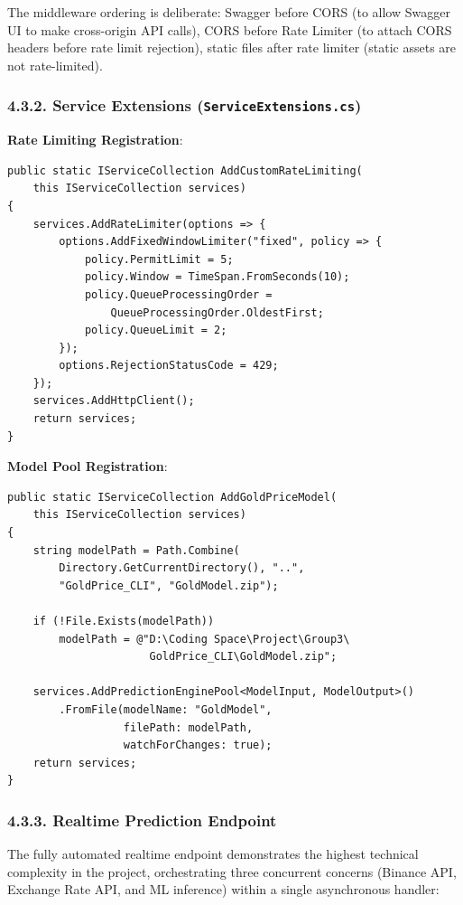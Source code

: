 The middleware ordering is deliberate: Swagger before CORS (to allow Swagger UI to make cross-origin API calls), CORS before Rate Limiter (to attach CORS headers before rate limit rejection), static files after rate limiter (static assets are not rate-limited).

\subsubsection{4.3.2. Service Extensions (\texttt{ServiceExtensions.cs})}

\textbf{Rate Limiting Registration}:
\begin{lstlisting}
public static IServiceCollection AddCustomRateLimiting(
    this IServiceCollection services)
{
    services.AddRateLimiter(options => {
        options.AddFixedWindowLimiter("fixed", policy => {
            policy.PermitLimit = 5;
            policy.Window = TimeSpan.FromSeconds(10);
            policy.QueueProcessingOrder =
                QueueProcessingOrder.OldestFirst;
            policy.QueueLimit = 2;
        });
        options.RejectionStatusCode = 429;
    });
    services.AddHttpClient();
    return services;
}
\end{lstlisting}

\textbf{Model Pool Registration}:
\begin{lstlisting}
public static IServiceCollection AddGoldPriceModel(
    this IServiceCollection services)
{
    string modelPath = Path.Combine(
        Directory.GetCurrentDirectory(), "..",
        "GoldPrice_CLI", "GoldModel.zip");
    
    if (!File.Exists(modelPath))
        modelPath = @"D:\Coding Space\Project\Group3\
                      GoldPrice_CLI\GoldModel.zip";

    services.AddPredictionEnginePool<ModelInput, ModelOutput>()
        .FromFile(modelName: "GoldModel",
                  filePath: modelPath,
                  watchForChanges: true);
    return services;
}
\end{lstlisting}

\subsubsection{4.3.3. Realtime Prediction Endpoint}
The fully automated realtime endpoint demonstrates the highest technical complexity in the project, orchestrating three concurrent concerns (Binance API, Exchange Rate API, and ML inference) within a single asynchronous handler:

